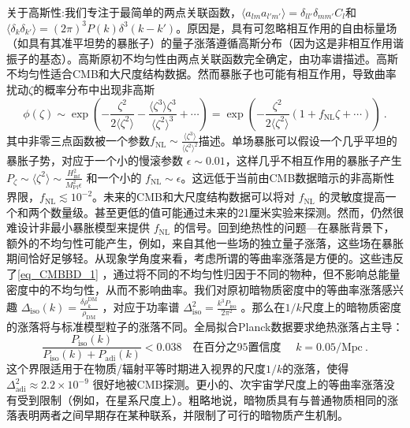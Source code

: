 关于高斯性:我们专注于最简单的两点关联函数，$\langle a_{lm}a_{l'm'}\rangle = \delta_{ll'}\delta_{mm'} C_l$和
$\langle \delta_k \delta_{k'}\rangle = (2\pi)^3 P(k)  \delta^3(k - k')$。原因是，具有可忽略相互作用的自由标量场（如具有其准平坦势的暴胀子）的量子涨落遵循高斯分布（因为这是非相互作用谐振子的基态）。高斯原初不均匀性由两点关联函数完全确定，由功率谱描述。高斯不均匀性适合CMB和大尺度结构数据。然而暴胀子也可能有相互作用，导致曲率扰动$\zeta$的概率分布中出现非高斯
\begin{equation}
\phi(\zeta) \sim \exp \left( -\frac{\zeta^2}{2\langle\zeta^2\rangle} - \frac{\langle\zeta^3\rangle\zeta^3}{\langle\zeta^2\rangle^3} + \cdots \right) = \exp \left( -\frac{\zeta^2}{2\langle\zeta^2\rangle} (1 + f_{\text{NL}}\zeta + \cdots) \right) ~.
\end{equation}
其中非零三点函数被一个参数\( f_{\text{NL}} \sim \frac{\langle\zeta^3\rangle}{\langle\zeta^2\rangle^2} \)描述。单场暴胀可以假设一个几乎平坦的暴胀子势，对应于一个小的慢滚参数 \( \epsilon \sim 0.01 \)，这样几乎不相互作用的暴胀子产生 \( P_\zeta \sim \langle\zeta^2\rangle \sim \frac{H^2_{\text{inf}}}{M^2_{\text{Pl}}\epsilon} \) 和一个小的 \( f_{\text{NL}} \sim \epsilon \)。这远低于当前由CMB数据暗示的非高斯性界限，\( f_{\text{NL}} \lesssim 10^{-2} \)。未来的CMB和大尺度结构数据可以将对 \( f_{\text{NL}} \) 的灵敏度提高一个和两个数量级。甚至更低的值可能通过未来的21厘米实验来探测。然而，仍然很难设计非最小暴胀模型来提供 \( f_{\text{NL}} \) 的信号。回到绝热性的问题—在暴胀背景下，额外的不均匀性可能产生，例如，来自其他一些场的独立量子涨落，这些场在暴胀期间恰好足够轻。从现象学角度来看，考虑所谓的等曲率涨落是方便的。这些违反了\autoref{eq_CMBBD_1} ，通过将不同的不均匀性归因于不同的物种，但不影响总能量密度中的不均匀性，从而不影响曲率。我们对原初暗物质密度中的等曲率涨落感兴趣 \( \Delta_{\text{iso}}(k) = \frac{\delta\rho_k^{\text{DM}}}{\rho_{\text{DM}}} \) ，对应于功率谱 \( \Delta^2_{\text{iso}} = \frac{k^3P_{\text{iso}}}{2\pi^2} \) 。那么在$1/k$尺度上的暗物质密度的涨落将与标准模型粒子的涨落不同。全局拟合Planck数据要求绝热涨落占主导：
\begin{equation}
\frac{P_{\text{iso}}(k)}{P_{\text{iso}}(k) + P_{\text{adi}}(k)} < 0.038 \quad \text{在百分之95置信度 }\quad k = 0.05/\text{Mpc} ~. 
\end{equation}
这个界限适用于在物质/辐射平等时期进入视界的尺度$1/k$的涨落，使得 \( \Delta^2_{\text{adi}} \approx 2.2 \times 10^{-9} \) 很好地被CMB探测。更小的、次宇宙学尺度上的等曲率涨落没有受到限制（例如，在星系尺度上）。粗略地说，暗物质具有与普通物质相同的涨落表明两者之间早期存在某种联系，并限制了可行的暗物质产生机制。


